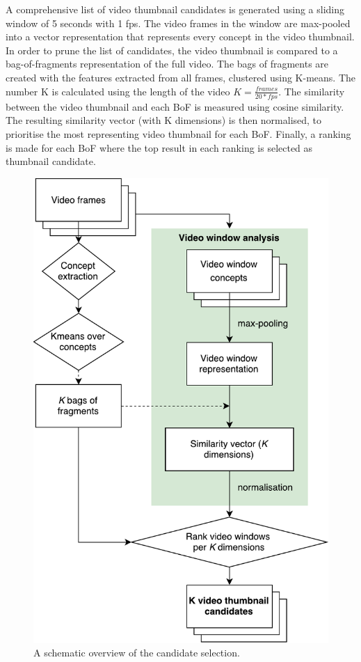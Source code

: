 \documentclass{../resources/sig-alternate-05-2015}
\begin{document}
A comprehensive list of video thumbnail candidates is generated using a sliding window of 5 seconds with 1 fps. The video frames in the window are max-pooled into a vector representation that represents every concept in the video thumbnail. In order to prune the list of candidates, the video thumbnail is compared to a bag-of-fragments representation of the full video. The bags of fragments are created with the features extracted from all frames, clustered using K-means. The number K is calculated using the length of the video $K = \frac{frames}{20 * fps}$. The similarity between the video thumbnail and each BoF is measured using cosine similarity. The resulting similarity vector (with K dimensions) is then normalised, to prioritise the most representing video thumbnail for each BoF. Finally, a ranking is made for each BoF where the top result in each ranking is selected as thumbnail candidate.


\begin{figure}[h]
	\centering
	\includegraphics[width=\linewidth]{resources/candidate-selection}
	\caption{A schematic overview of the candidate selection.}
	\label{figure: candidate selection scheme}
\end{figure}
\end{document}
